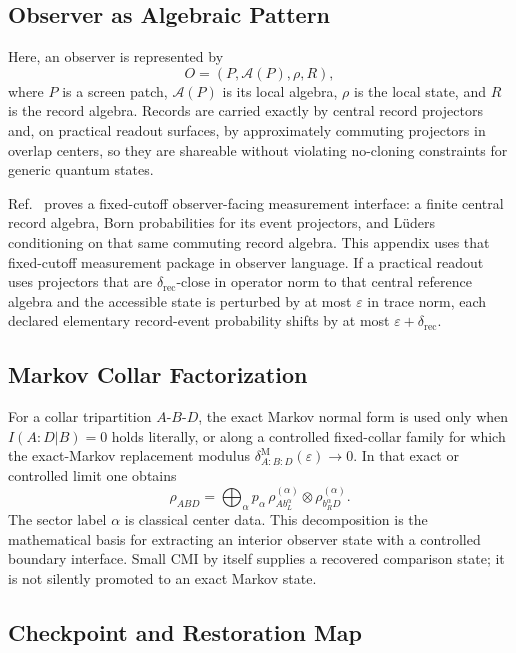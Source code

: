 \subsection{Observer as Algebraic Pattern}

Here, an observer is represented by
\[
O=(P,\mathcal{A}(P),\rho,R),
\]
where \(P\) is a screen patch, \(\mathcal{A}(P)\) is its local algebra, \(\rho\) is the local
state, and \(R\) is the record algebra. Records are carried exactly by central record projectors
and, on practical readout surfaces, by approximately commuting projectors in overlap centers, so
they are shareable without violating no-cloning constraints for generic quantum states.

Ref.~\cite{ophmicrophysics} proves a fixed-cutoff observer-facing measurement interface: a
finite central record algebra, Born probabilities for its event projectors, and L\"uders
conditioning on that same commuting record algebra. This appendix uses that fixed-cutoff
measurement package in observer language. If a practical readout uses projectors that are
\(\delta_{\mathrm{rec}}\)-close in operator norm to that central reference algebra and the
accessible state is perturbed by at most \(\varepsilon\) in trace norm, each declared elementary
record-event probability shifts by at most \(\varepsilon+\delta_{\mathrm{rec}}\).

\subsection{Markov Collar Factorization}

For a collar tripartition \(A\)-\(B\)-\(D\), the exact Markov normal form is used only when
\(I(A:D|B)=0\) holds literally, or along a controlled fixed-collar family for which the
exact-Markov replacement modulus \(\delta^{\mathrm M}_{A:B:D}(\varepsilon)\to0\). In that exact or
controlled limit one obtains
\[
\rho_{ABD}
=\bigoplus_{\alpha} p_{\alpha}\,
\rho^{(\alpha)}_{A b_L^{\alpha}}
\otimes
\rho^{(\alpha)}_{b_R^{\alpha} D}.
\]
The sector label \(\alpha\) is classical center data. This decomposition is the mathematical
basis for extracting an interior observer state with a controlled boundary interface. Small CMI by
itself supplies a recovered comparison state; it is not silently promoted to an exact Markov state.

\subsection{Checkpoint and Restoration Map}

